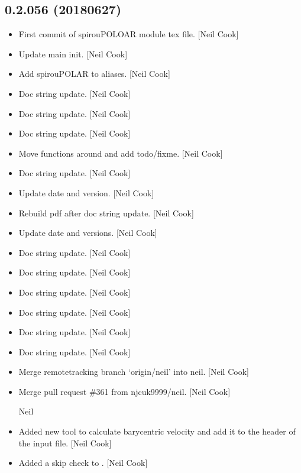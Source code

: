 \documentclass[a4paper,10pt,english]{report}
\begin{document}
\subsection{0.2.056 (2018\sphinxhyphen{}06\sphinxhyphen{}27)}
\label{\detokenize{misc/changelog:id428}}\begin{itemize}
\item {} 
First commit of spirouPOLOAR module tex file. {[}Neil Cook{]}

\item {} 
Update main init. {[}Neil Cook{]}

\item {} 
Add spirouPOLAR to aliases. {[}Neil Cook{]}

\item {} 
Doc string update. {[}Neil Cook{]}

\item {} 
Doc string update. {[}Neil Cook{]}

\item {} 
Doc string update. {[}Neil Cook{]}

\item {} 
Move functions around and add todo/fixme. {[}Neil Cook{]}

\item {} 
Doc string update. {[}Neil Cook{]}

\item {} 
Update date and version. {[}Neil Cook{]}

\item {} 
Rebuild pdf after doc string update. {[}Neil Cook{]}

\item {} 
Update date and versions. {[}Neil Cook{]}

\item {} 
Doc string update. {[}Neil Cook{]}

\item {} 
Doc string update. {[}Neil Cook{]}

\item {} 
Doc string update. {[}Neil Cook{]}

\item {} 
Doc string update. {[}Neil Cook{]}

\item {} 
Doc string update. {[}Neil Cook{]}

\item {} 
Doc string update. {[}Neil Cook{]}

\item {} 
Merge remote\sphinxhyphen{}tracking branch ‘origin/neil’ into neil. {[}Neil Cook{]}

\item {} 
Merge pull request \#361 from njcuk9999/neil. {[}Neil Cook{]}

Neil

\item {} 
Added new tool to calculate barycentric velocity and add it to the
header of the input file. {[}Neil Cook{]}

\item {} 
Added a skip check to . {[}Neil Cook{]}

\end{itemize}
\end{document}
